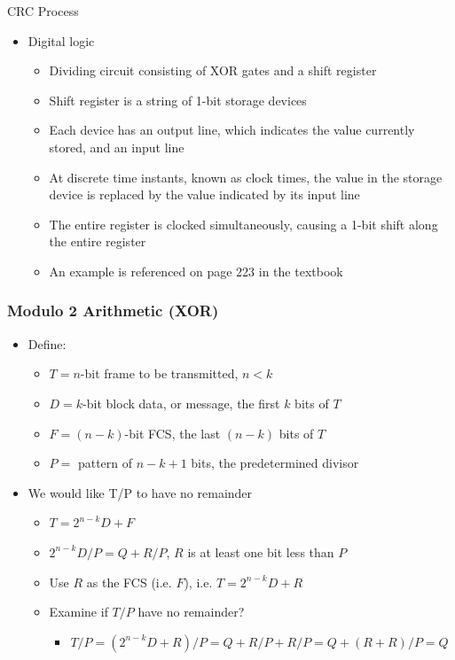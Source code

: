 \documentclass[pdflatex,compress]{beamer}
\begin{document}
\begin{frame}{CRC Process}
	\begin{itemize}
		\item Digital logic
		\begin{itemize}
			\item Dividing circuit consisting of XOR gates and a shift register
			\item Shift register is a string of 1-bit storage devices
			\item Each device has an output line, which indicates the value currently stored, and an input line
			\item At discrete time instants, known as clock times, the value in the storage device is replaced by the value indicated by its input line
			\item The entire register is clocked simultaneously, causing a 1-bit shift along the entire register
			\item An example is referenced on page 223 in the textbook
		\end{itemize}
	\end{itemize}
\end{frame}

\begin{frame}
	\frametitle{Modulo 2 Arithmetic (XOR)}
	\begin{itemize}
		\item Define:
		\begin{itemize}
			\item $ T = n $-bit frame to be transmitted, $ n < k $
			\item $ D = k $-bit block data, or message, the first $ k $ bits of $ T $
			\item $ F = (n-k) $-bit FCS, the last $ (n-k)$ bits of $ T $
			\item $ P = $ pattern of $ n-k+1 $ bits, the predetermined divisor
		\end{itemize}
		\item We would like T/P to have no remainder
		\begin{itemize}
			\item $ T=2^{n-k} D+F $
			\item $ 2^{n-k} D/P = Q + R/P $, $ R $ is at least one bit less than $ P $
			\item Use $ R $ as the FCS (i.e. $ F $), i.e. $ T = 2^{n-k}D + R $
			\item Examine if $ T/P $ have no remainder?
			\begin{itemize}
				\item $ T/P = (2^{n-k}D + R)/P = Q + R/P + R/P = Q + (R+R)/P = Q $
			\end{itemize}
		\end{itemize}
	\end{itemize}
\end{frame}
\end{document}
